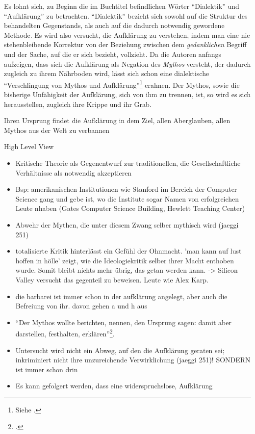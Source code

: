\documentclass[a4paper, 12pt]{article}
\begin{document}
\begin{onehalfspace}
Es lohnt sich, zu Beginn die im Buchtitel befindlichen Wörter "`Dialektik"' und "`Aufklärung"' zu betrachten. "`Dialektik"' bezieht sich sowohl auf die Struktur des behandelten Gegenstands, als auch auf die dadurch notwendig gewordene Methode. Es wird also versucht, die Aufklärung zu verstehen, indem man eine nie stehenbleibende Korrektur von der Beziehung zwischen dem \emph{gedanklichen} Begriff und der Sache, auf die er sich bezieht, vollzieht.  Da die Autoren anfangs aufzeigen, dass sich die Aufklärung als Negation des \emph{Mythos} versteht, der dadurch zugleich zu ihrem Nährboden wird, lässt sich schon eine dialektische "`Verschlingung von Mythos und Aufklärung"'\footnote{Siehe \Cite{habermas}.} erahnen. Der Mythos, sowie die bisherige Unfähigkeit der Aufklärung, sich von ihm zu trennen, ist, so wird es sich herausstellen, zugleich ihre Krippe und ihr Grab.

Ihren Ursprung findet die Aufklärung in dem Ziel, allen Aberglauben, allen Mythos aus der Welt zu verbannen


High Level View

\begin{itemize}
  \item Kritische Theorie als Gegenentwurf zur traditionellen, die Gesellschaftliche Verhältnisse als notwendig akzeptieren
  \item Bsp: amerikanischen Institutionen wie Stanford im Bereich der Computer Science gang und gebe ist, wo die Institute sogar Namen	 von erfolgreichen Leute nhaben (Gates Computer Science Building, Hewlett Teaching Center) 
  \item Abwehr der Mythen, die unter diesem Zwang selber mythisch wird (jaeggi 251)
  \item totalisierte Kritik hinterlässt ein Gefühl der Ohnmacht. 'man kann auf lust hoffen in hölle' zeigt, wie die Ideologiekritik selber ihrer Macht enthoben wurde. Somit bleibt nichts mehr übrig, das getan werden kann. -> Silicon Valley versucht das gegenteil zu beweisen. Leute wie Alex Karp.
  \item die barbarei ist immer schon in der aufklärung angelegt, aber auch die Befreiung von ihr. davon gehen a und h aus
  \item "`Der Mythos wollte berichten, nennen, den Ursprung sagen: damit aber darstellen, festhalten, erklären"'\footnote{\Cite[Siehe][S. 14]{dialektik-der-aufklaerung}.}.
  \item Untersucht wird nicht ein Abweg, auf den die Aufklärung geraten sei; inkriminiert nicht ihre unzureichende Verwirklichung (jaeggi 251)! SONDERN ist immer schon drin
  \item Es kann gefolgert werden, dass eine widerspruchslose, Aufklärung
\end{itemize}


\end{onehalfspace}
\end{document}
